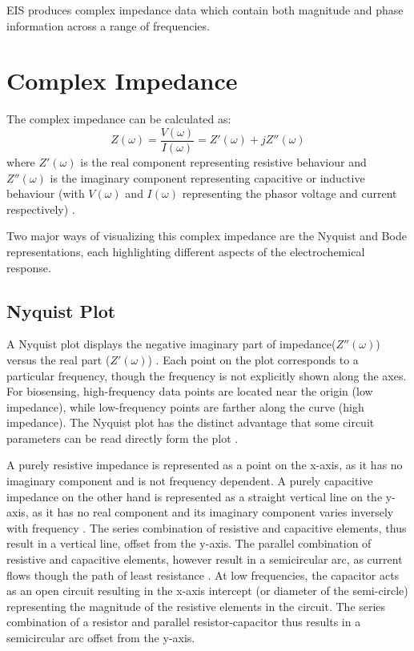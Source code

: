 \Ac{EIS} produces complex impedance data which contain both magnitude and phase information across a range of frequencies. 

\section{Complex Impedance}
The complex impedance can be calculated as:
\begin{equation}
    Z(\omega) = \frac{V(\omega)}{I(\omega)} = Z'(\omega) + jZ''(\omega)
\end{equation}
where $Z'(\omega)$ is the real component representing resistive behaviour and $Z''(\omega)$ is the imaginary component representing capacitive or inductive behaviour (with $V(\omega)$ and $I(\omega)$ representing the phasor voltage and current respectively) \cite{lazanasErratumElectrochemicalImpedance2025}.

Two major ways of visualizing this complex impedance are the Nyquist and Bode representations, each highlighting different aspects of the electrochemical response.

\subsection{Nyquist Plot}
A Nyquist plot displays the negative imaginary part of impedance($Z''(\omega)$) versus the real part ($Z'(\omega)$) \cite{BodeNyquistPlot}. Each point on the plot corresponds to a particular frequency, though the frequency is not explicitly shown along the axes. For biosensing, high-frequency data points are located near the origin (low impedance), while low-frequency points are farther along the curve (high impedance). The Nyquist plot has the distinct advantage that some circuit parameters can be read directly form the plot \cite{BodeNyquistPlot}. 

A purely resistive impedance is represented as a point on the x-axis, as it has no imaginary component and is not frequency dependent. A purely capacitive impedance on the other hand is represented as a straight vertical line on the y-axis, as it has no real component and its imaginary component varies inversely with frequency \cite{BodeNyquistPlot}. The series combination of resistive and capacitive elements, thus result in a vertical line, offset from the y-axis. The parallel combination of resistive and capacitive elements, however result in a semicircular arc, as current flows though the path of least resistance \cite{BodeNyquistPlot}. At low frequencies, the capacitor acts as an open circuit resulting in the x-axis intercept (or diameter of the semi-circle) representing the magnitude of the resistive elements in the circuit. The series combination of a resistor and parallel resistor-capacitor thus results in a semicircular arc offset from the y-axis.

